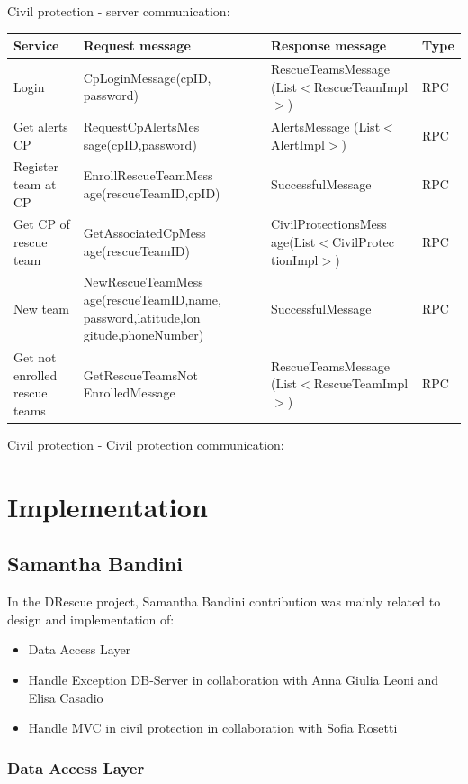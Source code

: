 \documentclass[a4paper,12pt]{report}
\begin{document}
Civil protection - server communication:

\begin{center}
\begin{tabular}{ |p{4cm}|p{4cm}|p{4cm}|p{2cm}| } 
\hline
Service 			& Request message 	& Response message		& Type 	\\
\hline
Login	& CpLoginMessage(cpID, password)	& RescueTeamsMessage (List$<$RescueTeamImpl$>$) 	& RPC	\\ 
Get alerts CP	& RequestCpAlertsMes sage(cpID,password)	& AlertsMessage (List$<$AlertImpl$>$) 	& RPC	\\ 
Register team at CP		& EnrollRescueTeamMess age(rescueTeamID,cpID)	& SuccessfulMessage & RPC	\\ 
Get CP of rescue team 	& GetAssociatedCpMess age(rescueTeamID)		& CivilProtectionsMess age(List$<$CivilProtec tionImpl$>$)	& RPC	\\ 
New team	& NewRescueTeamMess age(rescueTeamID,name, password,latitude,lon gitude,phoneNumber)	& SuccessfulMessage	& RPC	\\
Get not enrolled rescue teams & GetRescueTeamsNot EnrolledMessage	& RescueTeamsMessage (List$<$RescueTeamImpl$>$)	& RPC	\\
\hline
\end{tabular}
\end{center}

Civil protection - Civil protection communication:


\chapter{Implementation}

\section{Samantha Bandini}
In the DRescue project, Samantha Bandini contribution was mainly related to design and implementation of:
\begin{itemize}
\item Data Access Layer 
\item Handle Exception DB-Server in collaboration with Anna Giulia Leoni and Elisa Casadio
\item Handle MVC in civil protection in collaboration with Sofia Rosetti
\end{itemize}

\subsection{Data Access Layer}
\end{document}
